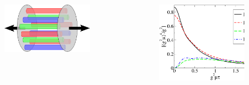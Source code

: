 \documentclass[aspectratio=169,11pt,usenames,dvipsnames]{beamer}
\begin{document}
\begin{frame}
\begin{columns}[onlytextwidth,t]
    \end{columns}

    \begin{columns}[onlytextwidth,t]

        \vspace{5pt}
        \begin{center}
            \begin{figure}
                \centering
                \hspace{-5pt}\includegraphics[width=0.9\textwidth]{images/glasma.eps}
            \end{figure}
        \end{center}

        \begin{center}
            \begin{figure}
                \centering
                \hspace{-5pt}\includegraphics[width=0.9\textwidth]{images/components.eps}
            \end{figure}
        \end{center}


\end{columns}
\end{frame}
\end{document}
